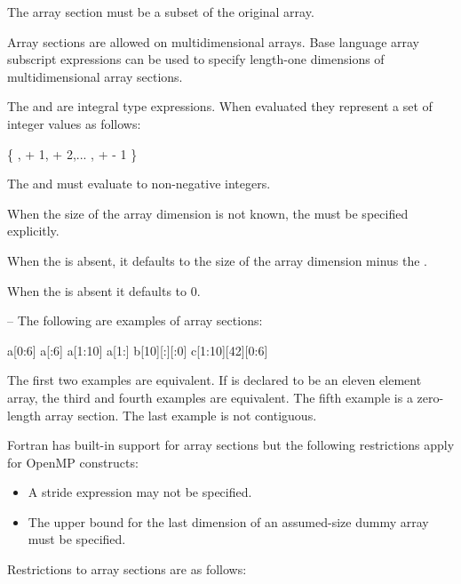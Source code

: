 The array section must be a subset of the original array.

Array sections are allowed on multidimensional arrays. Base language array subscript 
expressions can be used to specify length-one dimensions of multidimensional array 
sections.

The  and  are integral type expressions. When evaluated they 
represent a set of integer values as follows:

\{ ,  + 1,  + 2,... ,  +  - 1 \}

The  and  must evaluate to non-negative integers.

When the size of the array dimension is not known, the  must be specified 
explicitly.

When the  is absent, it defaults to the size of the array dimension minus the 
.

When the  is absent it defaults to 0.

\notestart
\noteheader – The following are examples of array sections:

\begin{indentedcodelist}
a[0:6]
a[:6]
a[1:10]
a[1:]
b[10][:][:0]
c[1:10][42][0:6]
\end{indentedcodelist}

The first two examples are equivalent. If  is declared to be an eleven element array, the 
third and fourth examples are equivalent. The fifth example is a zero-length array 
section. The last example is not contiguous.
\noteend
\medskip
\ccppspecificend

\fortranspecificstart
Fortran has built-in support for array sections but the following restrictions apply for 
OpenMP constructs:

\begin{itemize}
\item A stride expression may not be specified.

\item The upper bound for the last dimension of an assumed-size dummy array must be 
specified. 
\end{itemize}
\fortranspecificend

\restrictions
Restrictions to array sections are as follows:


